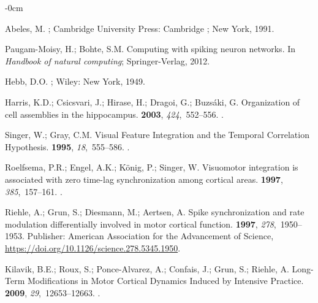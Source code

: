\documentclass[brainsci, %
               review,submit,pdftex,moreauthors
               ]{Definitions/mdpi}
\begin{document}
\begin{adjustwidth}{-\extralength}{0cm}
\begin{thebibliography}{999}
  Abeles, M.
  ; Cambridge
    University Press: Cambridge ; New York,  1991.
  
  Paugam-Moisy, H.; Bohte, S.M.
  \newblock Computing with spiking neuron networks. In {\em Handbook of natural
    computing}; Springer-Verlag,  2012.
  
  Hebb, D.O.
  ;
    Wiley: New York,  1949.
  
  Harris, K.D.; Csicsvari, J.; Hirase, H.; Dragoi, G.; Buzsáki, G.
  \newblock Organization of cell assemblies in the hippocampus.
   {\bf 2003}, {\em 424},~552--556.
  .
  
  Singer, W.; Gray, C.M.
  \newblock Visual {Feature} {Integration} and the {Temporal} {Correlation}
    {Hypothesis}.
   {\bf 1995}, {\em 18},~555--586.
  .
  
  Roelfsema, P.R.; Engel, A.K.; König, P.; Singer, W.
  \newblock Visuomotor integration is associated with zero time-lag
    synchronization among cortical areas.
   {\bf 1997}, {\em 385},~157--161.
  .
  
  Riehle, A.; Grun, S.; Diesmann, M.; Aertsen, A.
  \newblock Spike synchronization and rate modulation differentially involved in
    motor cortical function.
   {\bf 1997}, {\em 278},~1950--1953.
  \newblock Publisher: American Association for the Advancement of Science,
    {\url{https://doi.org/10.1126/science.278.5345.1950}}.
  
  Kilavik, B.E.; Roux, S.; Ponce-Alvarez, A.; Confais, J.; Grun, S.; Riehle, A.
  \newblock Long-{Term} {Modifications} in {Motor} {Cortical} {Dynamics}
    {Induced} by {Intensive} {Practice}.
   {\bf 2009}, {\em 29},~12653--12663.
  .
  

\end{thebibliography}
\end{adjustwidth}
\end{document}
